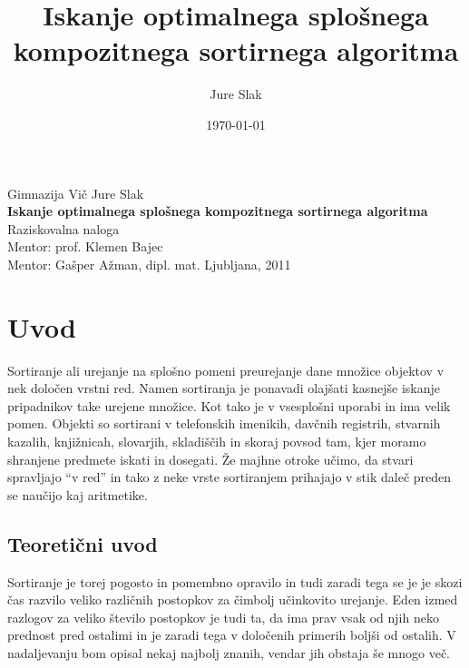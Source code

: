 \documentclass[a4paper,oneside,12pt]{article}
\title{Iskanje optimalnega splošnega kompozitnega sortirnega algoritma}
\author{Jure Slak}
\date{\today}
\begin{document}
\renewcommand{\listfigurename}{Kazalo slik} 
\renewcommand{\listalgorithmname}{Kazalo algoritmov}

\addto\captionsslovene { %
\renewcommand\bibname{} %
}
\renewcommand\refname{}


\thispagestyle{empty}

\begin{center}{\large
  Gimnazija Vič
  \vfill
  {\Large Jure Slak}\\[20mm]
  {\bf \huge Iskanje optimalnega splošnega kompozitnega sortirnega algoritma}\\[10mm]
  Raziskovalna naloga\\[1cm]
  Mentor: prof. Klemen Bajec \\[2mm]
  Mentor: Gašper Ažman, dipl. mat.}
  \vfill
  \vfill
  \large Ljubljana, 2011
\end{center}
\pagebreak

\thispagestyle{empty}
\tableofcontents
\pagebreak
\thispagestyle{empty}
\listoffigures
\pagebreak
\thispagestyle{empty}
\listofalgorithms
\pagebreak

\section{Uvod}
\label{chapter:uvod}

Sortiranje ali urejanje na splošno pomeni preurejanje dane množice objektov
v nek določen vrstni red.
Namen sortiranja je ponavadi olajšati kasnejše iskanje pripadnikov take urejene množice. Kot tako je
v vsesplošni uporabi in ima velik pomen. Objekti so sortirani v telefonskih imenikih,
davčnih registrih, stvarnih kazalih, knjižnicah, slovarjih, skladiščih in skoraj povsod tam,
kjer moramo shranjene predmete iskati in dosegati. Že majhne otroke učimo, da stvari spravljajo
``v red'' in tako z neke vrste sortiranjem prihajajo v stik daleč preden se naučijo kaj
aritmetike.

\subsection{Teoretični uvod}
\label{chapter:teoreticni}
Sortiranje je torej pogosto in pomembno opravilo in tudi zaradi tega se je je skozi čas
razvilo veliko različnih postopkov za čimbolj učinkovito urejanje. Eden izmed razlogov za
veliko število postopkov je tudi ta, da ima prav vsak od njih neko prednost pred ostalimi in je
zaradi tega v določenih primerih boljši od ostalih. V nadaljevanju bom opisal nekaj najbolj znanih, 
vendar jih obstaja še mnogo več. 
\end{document}
